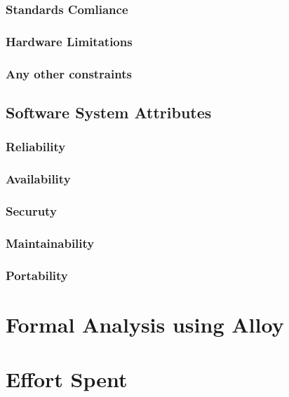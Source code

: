 \documentclass{Configuration_Files/PoliMi3i_thesis}
\begin{document}
\subsection{Standards Comliance}
\subsection{Hardware Limitations}
\subsection{Any other constraints}

\section{Software System Attributes}
\subsection{Reliability}
\subsection{Availability}
\subsection{Securuty}
\subsection{Maintainability}
\subsection{Portability}

\chapter{Formal Analysis using Alloy}

\chapter{Effort Spent}
\end{document}

